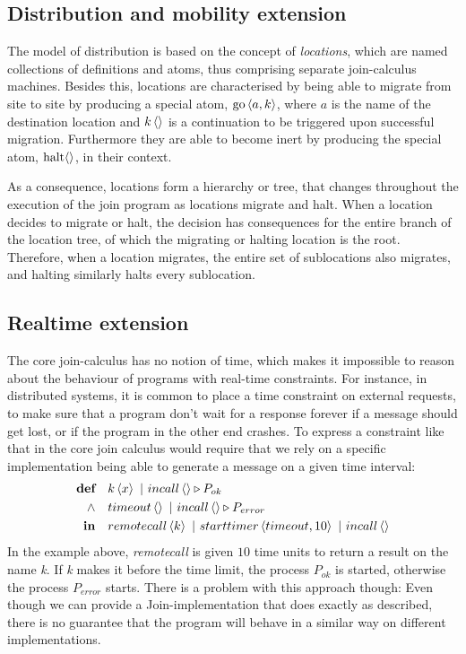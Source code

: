 \subsection{Distribution and mobility extension}
The model of distribution is based on the concept of \emph{locations}, which
are named collections of definitions and atoms, thus comprising separate
join-calculus machines. Besides this, locations are characterised by being able
to migrate from site to site by producing a special atom, $\Go<a,k>$, where $a$
is the name of the destination location and $\atm k <>$ is a continuation to be
triggered upon successful migration. Furthermore they are able to become inert
by producing the special atom, $\Halt<>$, in their context.

As a consequence, locations form a hierarchy or tree, that changes throughout
the execution of the join program as locations migrate and halt.
When a location decides to migrate or halt, the decision has consequences for
the entire branch of the location tree, of which the migrating or halting
location is the root. Therefore, when a location migrates, the entire set of
sublocations also migrates, and halting similarly halts every sublocation.


\subsection{Realtime extension}

The core join-calculus has no notion of time, which makes it
impossible to reason about the behaviour of programs with real-time
constraints.  For instance, in distributed systems, it is common to
place a time constraint on external requests, to make sure that a
program don't wait for a response forever if a message should get
lost, or if the program in the other end crashes. To express a
constraint like that in the core join calculus would require that we
rely on a specific implementation being able to generate a message on
a given time interval:
\begin{align*}
  \textbf{def}\quad & \atm k<x> ~|~ \atm incall<> \triangleright P_{ok} \\
  \land\quad & \atm timeout<> ~|~ \atm incall<> \triangleright P_{error} \\
  \textbf{in}\quad & \atm remotecall<k> ~|~ \atm starttimer<timeout, 10>
                                      ~|~ \atm incall<>
\end{align*}
In the example above, \emph{remotecall} is given $10$ time units to
return a result on the name \emph{k}. If \emph{k} makes it before the
time limit, the process $P_{ok}$ is started, otherwise the process
$P_{error}$ starts.  There is a problem with this approach though:
Even though we can provide a Join-implementation that does exactly as
described, there is no guarantee that the program will behave in a
similar way on different implementations.

